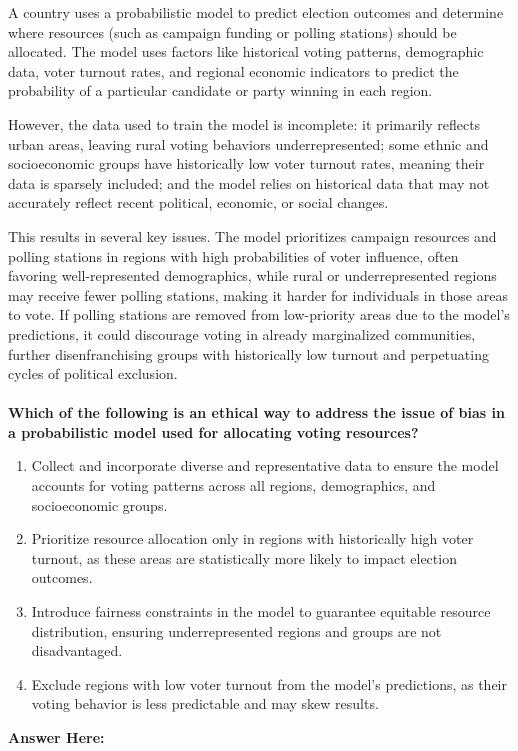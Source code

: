 \documentclass{article}
\begin{document}
A country uses a probabilistic model to predict election outcomes and determine where resources 
(such as campaign funding or polling stations) should be allocated. The model uses factors like 
historical voting patterns, demographic data, voter turnout rates, and regional economic indicators 
to predict the probability of a particular candidate or party winning in each region. 

However, the data used to train the model is incomplete: it primarily reflects urban areas, leaving 
rural voting behaviors underrepresented; some ethnic and socioeconomic groups have historically 
low voter turnout rates, meaning their data is sparsely included; and the model relies on historical 
data that may not accurately reflect recent political, economic, or social changes. 

This results in several key issues. The model prioritizes campaign resources and polling stations 
in regions with high probabilities of voter influence, often favoring well-represented demographics, 
while rural or underrepresented regions may receive fewer polling stations, making it harder for 
individuals in those areas to vote. If polling stations are removed from low-priority areas due to 
the model's predictions, it could discourage voting in already marginalized communities, further 
disenfranchising groups with historically low turnout and perpetuating cycles of political exclusion. 
 \\ \\

\textbf{Which of the following is an ethical way to address the issue of bias in a probabilistic model used for allocating voting resources?}
\begin{enumerate}[label=\Alph*)]
    \item Collect and incorporate diverse and representative data to ensure the model accounts for voting patterns across all regions, demographics, and socioeconomic groups.
    \item Prioritize resource allocation only in regions with historically high voter turnout, as these areas are statistically more likely to impact election outcomes.
    \item Introduce fairness constraints in the model to guarantee equitable resource distribution, ensuring underrepresented regions and groups are not disadvantaged.
    \item Exclude regions with low voter turnout from the model’s predictions, as their voting behavior is less predictable and may skew results.
\end{enumerate}
\textbf{Answer Here:}
\end{document}

